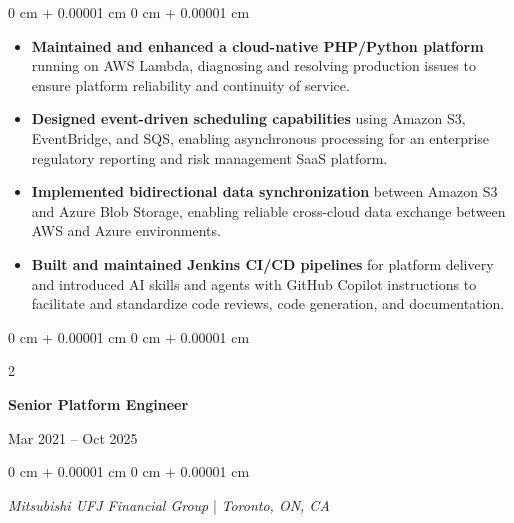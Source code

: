\documentclass[11pt, letterpaper]{article}
\newenvironment{highlights}{
\begin{itemize}[
topsep=0.10 cm,
parsep=0.10 cm,
partopsep=0pt,
itemsep=0pt,
leftmargin=0 cm + 20pt
]
}{
\end{itemize}
} %
\newenvironment{onecolentry}{
\begin{adjustwidth}{
0 cm + 0.00001 cm
}{
0 cm + 0.00001 cm
}
}{
\end{adjustwidth}
} %
\newenvironment{twocolentry}[2][]{
\onecolentry
\def\secondColumn{#2}
\setcolumnwidth{\fill, 4.5 cm}
\begin{paracol}{2}
}{
\switchcolumn \raggedleft \secondColumn
\end{paracol}
\endonecolentry
} %
\begin{document}
\vspace{0.10 cm}
\begin{onecolentry}
\begin{highlights}
\item \textbf{Maintained and enhanced a cloud-native PHP/Python platform} running on AWS Lambda, diagnosing and resolving production issues to ensure platform reliability and continuity of service.

\item \textbf{Designed event-driven scheduling capabilities} using Amazon S3, EventBridge, and SQS, enabling asynchronous processing for an enterprise regulatory reporting and risk management SaaS platform.

\item \textbf{Implemented bidirectional data synchronization} between Amazon S3 and Azure Blob Storage, enabling reliable cross-cloud data exchange between AWS and Azure environments.

\item \textbf{Built and maintained Jenkins CI/CD pipelines} for platform delivery and introduced AI skills and agents with GitHub Copilot instructions to facilitate and standardize code reviews, code generation, and documentation.
\end{highlights}
\end{onecolentry}

\vspace{0.2 cm}

\begin{twocolentry}{
Mar 2021 – Oct 2025
}
\textbf{Senior Platform Engineer}
\end{twocolentry}

\begin{onecolentry}
\textit{Mitsubishi UFJ Financial Group} | \textit{Toronto, ON, CA}
\end{onecolentry}
\end{document}
